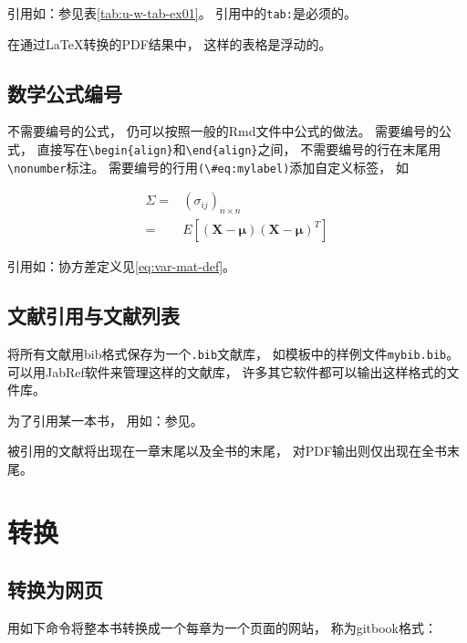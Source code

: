 \documentclass[
]{book}
\theoremstyle{definition}
\theoremstyle{definition}
\theoremstyle{definition}
\theoremstyle{definition}
\theoremstyle{remark}
\begin{document}
引用如：参见表\ref{tab:u-w-tab-ex01}。
引用中的\texttt{tab:}是必须的。

在通过LaTeX转换的PDF结果中，
这样的表格是浮动的。

\hypertarget{usage-writing-math}{%
\subsection{数学公式编号}\label{usage-writing-math}}

不需要编号的公式，
仍可以按照一般的Rmd文件中公式的做法。
需要编号的公式，
直接写在\texttt{\textbackslash{}begin\{align\}}和\texttt{\textbackslash{}end\{align\}}之间，
不需要编号的行在末尾用\texttt{\textbackslash{}nonumber}标注。
需要编号的行用\texttt{(\textbackslash{}\#eq:mylabel)}添加自定义标签，
如

\begin{align}
\Sigma =&  (\sigma_{ij})_{n\times n} \nonumber \\
=& E[(\boldsymbol{X} - \boldsymbol{\mu}) (\boldsymbol{X} - \boldsymbol{\mu})^T ] 
\label{eq:var-mat-def}
\end{align}

引用如：协方差定义见\eqref{eq:var-mat-def}。

\hypertarget{ux6587ux732eux5f15ux7528ux4e0eux6587ux732eux5217ux8868}{%
\subsection{文献引用与文献列表}\label{ux6587ux732eux5f15ux7528ux4e0eux6587ux732eux5217ux8868}}

将所有文献用bib格式保存为一个\texttt{.bib}文献库，
如模板中的样例文件\texttt{mybib.bib}。
可以用JabRef软件来管理这样的文献库，
许多其它软件都可以输出这样格式的文件库。

为了引用某一本书，
用如：参见\autocite{Wichmann1982:RNG}。

被引用的文献将出现在一章末尾以及全书的末尾，
对PDF输出则仅出现在全书末尾。

\hypertarget{usage-output}{%
\section{转换}\label{usage-output}}

\hypertarget{usage-gitbook}{%
\subsection{转换为网页}\label{usage-gitbook}}

用如下命令将整本书转换成一个每章为一个页面的网站，
称为gitbook格式：
\end{document}
